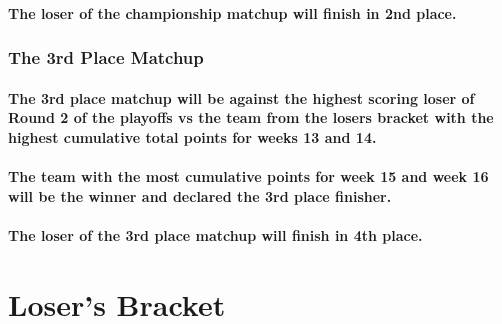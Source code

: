 \documentclass[
]{book}
\begin{document}
\hypertarget{the-loser-of-the-championship-matchup-will-finish-in-2nd-place.}{%
\paragraph{The loser of the championship matchup will finish in 2nd place.}\label{the-loser-of-the-championship-matchup-will-finish-in-2nd-place.}}

\hypertarget{the-3rd-place-matchup}{%
\subsubsection{The 3rd Place Matchup}\label{the-3rd-place-matchup}}

\hypertarget{the-3rd-place-matchup-will-be-against-the-highest-scoring-loser-of-round-2-of-the-playoffs-vs-the-team-from-the-losers-bracket-with-the-highest-cumulative-total-points-for-weeks-13-and-14.}{%
\paragraph{The 3rd place matchup will be against the highest scoring loser of Round 2 of the playoffs vs the team from the losers bracket with the highest cumulative total points for weeks 13 and 14.}\label{the-3rd-place-matchup-will-be-against-the-highest-scoring-loser-of-round-2-of-the-playoffs-vs-the-team-from-the-losers-bracket-with-the-highest-cumulative-total-points-for-weeks-13-and-14.}}

\hypertarget{the-team-with-the-most-cumulative-points-for-week-15-and-week-16-will-be-the-winner-and-declared-the-3rd-place-finisher.}{%
\paragraph{The team with the most cumulative points for week 15 and week 16 will be the winner and declared the 3rd place finisher.}\label{the-team-with-the-most-cumulative-points-for-week-15-and-week-16-will-be-the-winner-and-declared-the-3rd-place-finisher.}}

\hypertarget{the-loser-of-the-3rd-place-matchup-will-finish-in-4th-place.}{%
\paragraph{The loser of the 3rd place matchup will finish in 4th place.}\label{the-loser-of-the-3rd-place-matchup-will-finish-in-4th-place.}}

\hypertarget{losers-bracket}{%
\section{Loser's Bracket}\label{losers-bracket}}
\end{document}
